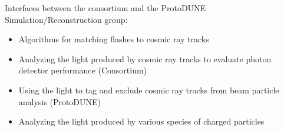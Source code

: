 Interfaces between the consortium and the ProtoDUNE Simulation/Reconstruction group:

\begin{itemize}
    \item Algorithms for matching flashes to cosmic ray tracks
    \item Analyzing the light produced by cosmic ray tracks to evaluate photon detector performance (Consortium)
    \item Using the light to tag and exclude cosmic ray tracks from beam particle analysis (ProtoDUNE)
    \item Analyzing the light produced by various species of charged particles
\end{itemize}








